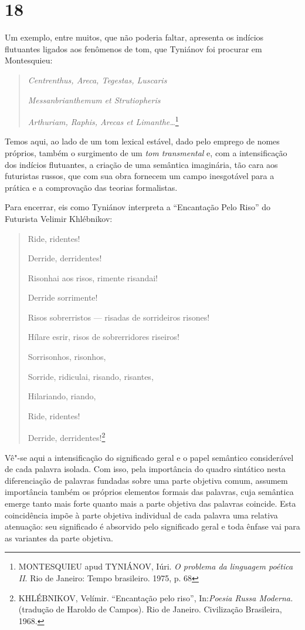 \section{18}

Um exemplo, entre muitos, que não poderia faltar, apresenta os indícios
flutuantes ligados aos fenômenos de tom, que Tyniánov foi procurar em
Montesquieu:

\begin{quote}
\emph{Centrenthus, Areca, Tegestas, Luscaris}

\emph{Messanbrianthemum et Strutiopheris}

\emph{Arthuriam, Raphis, Arecas et Limanthe\ldots{}}\footnote{MONTESQUIEU
  apud TYNIÁNOV, Iúri. \emph{O problema da linguagem poética II}. Rio de
  Janeiro: Tempo brasileiro. 1975, p. 68}
\end{quote}

Temos aqui, ao lado de um tom lexical estável, dado pelo emprego de
nomes próprios, também o surgimento de um \emph{tom transmental} e, com
a intensificação dos indícios flutuantes, a criação de uma semântica
imaginária, tão cara aos futuristas russos, que com sua obra fornecem um
campo inesgotável para a prática e a comprovação das teorias
formalistas.

Para encerrar, eis como Tyniánov interpreta a ``Encantação Pelo Riso''
do Futurista Velimir Khlébnikov:

\begin{quote}
Ride, ridentes!

Derride, derridentes!

Risonhai aos risos, rimente risandai!

Derride sorrimente!

Risos sobrerristos --- risadas de sorrideiros risones!

Hílare esrir, risos de sobrerridores riseiros!

Sorrisonhos, risonhos,

Sorride, ridiculai, risando, risantes,

Hilariando, riando,

Ride, ridentes!

Derride, derridentes!\footnote{KHLÉBNIKOV, Velímir. ``Encantação pelo
  riso'', In:\emph{Poesia Russa Moderna.}(tradução de Haroldo de
  Campos). Rio de Janeiro. Civilização Brasileira, 1968.}
\end{quote}

Vê"-se aqui a intensificação do significado geral e o papel semântico
considerável de cada palavra isolada. Com isso, pela importância do
quadro sintático nesta diferenciação de palavras fundadas sobre uma
parte objetiva comum, assumem importância também os próprios elementos
formais das palavras, cuja semântica emerge tanto mais forte quanto mais
a parte objetiva das palavras coincide. Esta coincidência impõe à parte
objetiva individual de cada palavra uma relativa atenuação: seu
significado é absorvido pelo significado geral e toda ênfase vai para as
variantes da parte objetiva.

